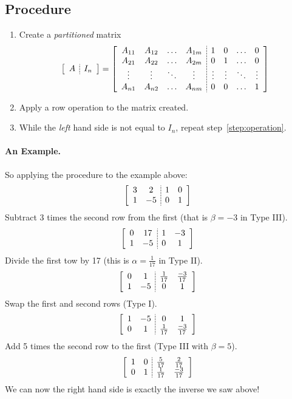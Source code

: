 \subsection{Procedure}
\begin{enumerate}
\item Create a \textit{partitioned} matrix 
\[
\left[\begin{array}{c;{2pt/1pt}c}A&I_n\end{array}\right] = 
\left[\begin{array}{cccc;{2pt/1pt}cccc}
A_{11} & A_{12} & \hdots & A_{1m} & 1 & 0 & \hdots & 0\\
A_{21} & A_{22} & \hdots & A_{2m} & 0 & 1 & \hdots & 0\\
\vdots & \vdots & \ddots & \vdots &\vdots & \vdots & \ddots & \vdots \\
A_{n1} & A_{n2} & \hdots & A_{nm} & 0 & 0 & \hdots & 1\\
\end{array}\right]
\]
\item Apply a row operation to the matrix created.\label{step:operation}
\item While the \textit{left} hand side is not equal to $I_n$, repeat step~\ref{step:operation}.
\end{enumerate}

\paragraph{An Example.} So applying the procedure to the example above: 
\[\left[\begin{array}{cc;{2pt/1pt}cc} 3 & 2 & 1 & 0\\ 1 & -5 & 0 & 1\end{array}\right]\]
Subtract 3 times the second row from the first (that is $\beta=-3$ in Type III).
\[\left[\begin{array}{cc;{2pt/1pt}cc} 0 & 17 & 1 & -3\\ 1 & -5 & 0 & 1\end{array}\right]\]
Divide the first tow by 17 (this is $\alpha=\frac{1}{17}$ in Type II).
\[\left[\begin{array}{cc;{2pt/1pt}cc} 0 & 1 & \frac{1}{17} & \frac{-3}{17}\\ 1 & -5 & 0 & 1\end{array}\right]\]
Swap the first and second rows (Type I).
\[\left[\begin{array}{cc;{2pt/1pt}cc}  1 & -5 & 0 & 1\\0 & 1 & \frac{1}{17} & \frac{-3}{17}\\\end{array}\right]\]
Add 5 times the second row to the first (Type III with $\beta=5$).
\[\left[\begin{array}{cc;{2pt/1pt}cc}  1 & 0 & \frac{5}{17} & \frac{2}{17}\\0 & 1 & \frac{1}{17} & \frac{-3}{17}\\\end{array}\right]\]
We can now the right hand side is exactly the inverse we saw above! 

